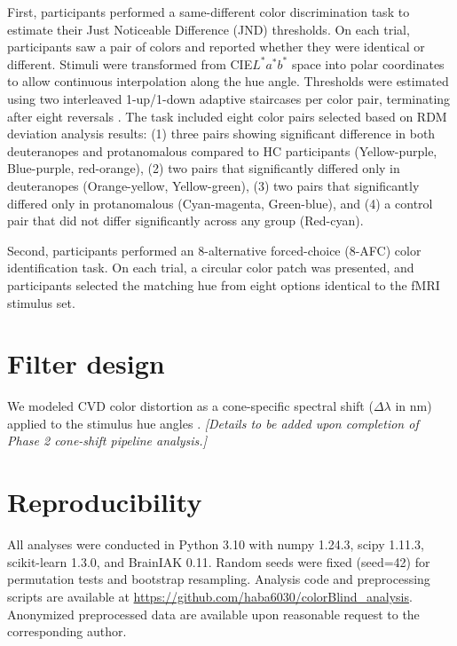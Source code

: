First, participants performed a same-different color discrimination task to estimate their Just Noticeable Difference (JND) thresholds. On each trial, participants saw a pair of colors and reported whether they were identical or different. Stimuli were transformed from CIE$L^*a^*b^*$ space into polar coordinates to allow continuous interpolation along the hue angle. Thresholds were estimated using two interleaved 1-up/1-down adaptive staircases per color pair, terminating after eight reversals \cite{levitt1971}. The task included eight color pairs selected based on RDM deviation analysis results: (1) three pairs showing significant difference in both deuteranopes and protanomalous compared to HC participants (Yellow-purple, Blue-purple, red-orange), (2) two pairs that significantly differed only in deuteranopes (Orange-yellow, Yellow-green), (3) two pairs that significantly differed only in protanomalous (Cyan-magenta, Green-blue), and (4) a control pair that did not differ significantly across any group (Red-cyan).

Second, participants performed an 8-alternative forced-choice (8-AFC) color identification task. On each trial, a circular color patch was presented, and participants selected the matching hue from eight options identical to the fMRI stimulus set.

\section{Filter design}

We modeled CVD color distortion as a cone-specific spectral shift ($\Delta\lambda$ in nm) applied to the stimulus hue angles \cite{brettel1997}. \textit{[Details to be added upon completion of Phase 2 cone-shift pipeline analysis.]}

\section{Reproducibility}

All analyses were conducted in Python 3.10 with numpy 1.24.3, scipy 1.11.3, scikit-learn 1.3.0, and BrainIAK 0.11. Random seeds were fixed (seed=42) for permutation tests and bootstrap resampling. Analysis code and preprocessing scripts are available at \url{https://github.com/haba6030/colorBlind_analysis}. Anonymized preprocessed data are available upon reasonable request to the corresponding author.

\clearpage


